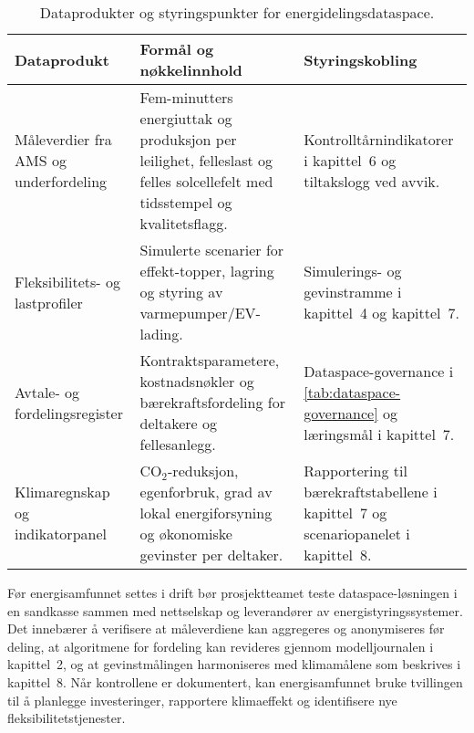 \begin{table}[ht]
    \centering
    \caption{Dataprodukter og styringspunkter for energidelingsdataspace.}
    \label{tab:energideling-datakrav}
    \begin{tabular}{p{3.4cm}p{4.6cm}p{4.0cm}}
        \toprule
        \textbf{Dataprodukt} & \textbf{Formål og nøkkelinnhold} & \textbf{Styringskobling} \\
        \midrule
        Måleverdier fra AMS og underfordeling & Fem-minutters energiuttak og produksjon per leilighet, felleslast og felles solcellefelt med tidsstempel og kvalitetsflagg. & Kontrolltårnindikatorer i kapittel~6 og tiltakslogg ved avvik. \\
        \addlinespace
        Fleksibilitets- og lastprofiler & Simulerte scenarier for effekt-topper, lagring og styring av varmepumper/EV-lading. & Simulerings- og gevinstramme i kapittel~4 og kapittel~7. \\
        \addlinespace
        Avtale- og fordelingsregister & Kontraktsparametere, kostnadsnøkler og bærekraftsfordeling for deltakere og fellesanlegg. & Dataspace-governance i \autoref{tab:dataspace-governance} og læringsmål i kapittel~7. \\
        \addlinespace
        Klimaregnskap og indikatorpanel & CO$_2$-reduksjon, egenforbruk, grad av lokal energiforsyning og økonomiske gevinster per deltaker. & Rapportering til bærekraftstabellene i kapittel~7 og scenariopanelet i kapittel~8. \\
        \bottomrule
    \end{tabular}
\end{table}

Før energisamfunnet settes i drift bør prosjektteamet teste dataspace-løsningen i en sandkasse sammen med nettselskap og leverandører av energistyringssystemer. Det innebærer å verifisere at måleverdiene kan aggregeres og anonymiseres før deling, at algoritmene for fordeling kan revideres gjennom modelljournalen i kapittel~2, og at gevinstmålingen harmoniseres med klimamålene som beskrives i kapittel~8. Når kontrollene er dokumentert, kan energisamfunnet bruke tvillingen til å planlegge investeringer, rapportere klimaeffekt og identifisere nye fleksibilitetstjenester.

